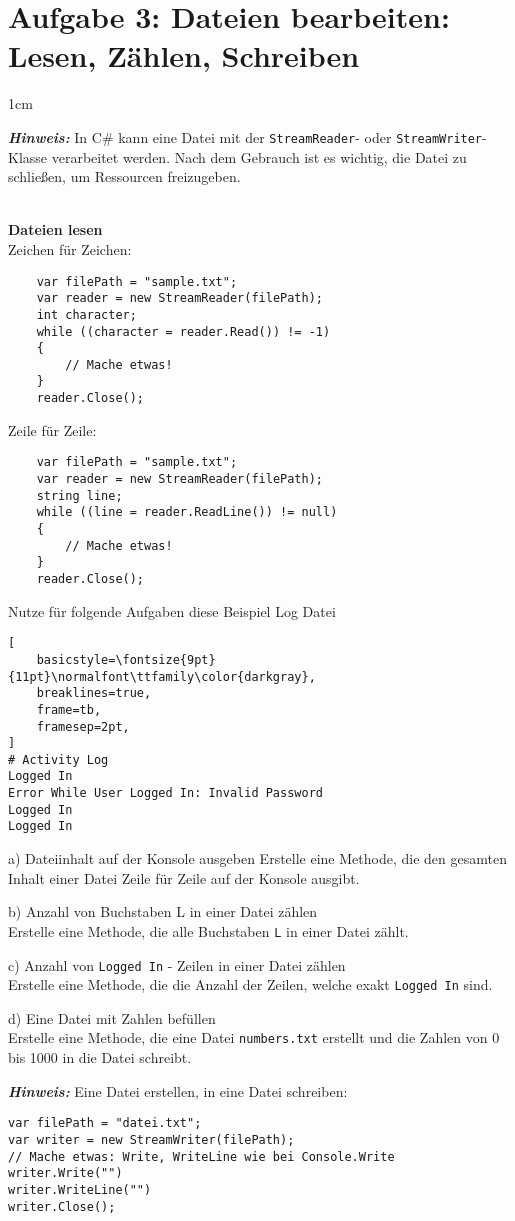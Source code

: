 \documentclass[12pt]{article}
\newenvironment{aufgabe}[2]
  {%
   \section*{Aufgabe #1: #2}
   \vspace{0.5em}
   \begin{adjustwidth}{1cm}{}  %
  }
  {%
   \end{adjustwidth}
  }
\newcommand{\subaufgabe}[1]{
    #1
}
\newcommand{\hint}[1]{
    \vspace{0.5em}
    \textbf{\textit{Hinweis:}} #1
    \vspace{0.5em}
}
\begin{document}
\newpage
\begin{aufgabe}{3}{Dateien bearbeiten: Lesen, Zählen, Schreiben}
\hint{In C\# kann eine Datei mit der \texttt{StreamReader}- oder \texttt{StreamWriter}-Klasse verarbeitet werden. Nach dem Gebrauch ist es wichtig, die Datei zu schließen, um Ressourcen freizugeben.}
\\
\textbf{Dateien lesen}
\\
Zeichen für Zeichen:
\begin{lstlisting}
    var filePath = "sample.txt";
    var reader = new StreamReader(filePath);
    int character;
    while ((character = reader.Read()) != -1)
    {
        // Mache etwas!
    }
    reader.Close();
\end{lstlisting}

Zeile für Zeile:
\begin{lstlisting}
    var filePath = "sample.txt";
    var reader = new StreamReader(filePath);
    string line;
    while ((line = reader.ReadLine()) != null)
    {
        // Mache etwas!
    }
    reader.Close();
\end{lstlisting}
Nutze für folgende Aufgaben diese Beispiel Log Datei
\begin{lstlisting}[
    basicstyle=\fontsize{9pt}{11pt}\normalfont\ttfamily\color{darkgray},
    breaklines=true,
    frame=tb,
    framesep=2pt,
]
# Activity Log
Logged In
Error While User Logged In: Invalid Password
Logged In
Logged In
\end{lstlisting}
\subaufgabe{a) Dateiinhalt auf der Konsole ausgeben
Erstelle eine Methode, die den gesamten Inhalt einer Datei Zeile für Zeile auf der Konsole ausgibt.
}

\subaufgabe{b) Anzahl von Buchstaben L in einer Datei zählen \\
Erstelle eine Methode, die alle Buchstaben \texttt{L} in einer Datei zählt.
}

\subaufgabe{c) Anzahl von \texttt{Logged In} - Zeilen in einer Datei zählen \\
Erstelle eine Methode, die die Anzahl der Zeilen, welche exakt \texttt{Logged In} sind.
}

\subaufgabe{d) Eine Datei mit Zahlen befüllen \\
Erstelle eine Methode, die eine Datei \texttt{numbers.txt} erstellt und die Zahlen von 0 bis 1000 in die Datei schreibt.
}

\hint{Eine Datei erstellen, in eine Datei schreiben:}
\begin{lstlisting}
var filePath = "datei.txt";
var writer = new StreamWriter(filePath);
// Mache etwas: Write, WriteLine wie bei Console.Write
writer.Write("")
writer.WriteLine("")
writer.Close();
\end{lstlisting}

\end{aufgabe}
\end{document}
